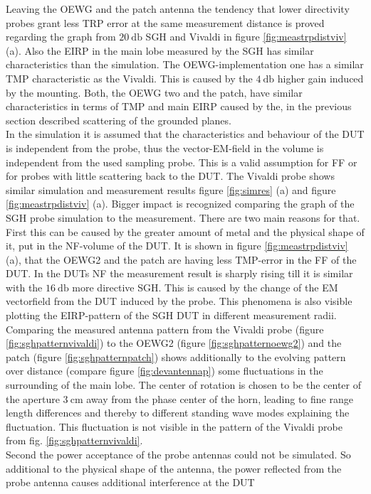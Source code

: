Leaving the \ac{OEWG} and the patch antenna the tendency that lower directivity probes grant less \ac{TRP} error at the same measurement distance is proved regarding the graph from $\SI{20}{\decibel}$ \ac{SGH} and Vivaldi in figure \ref{fig:meastrpdistviv} (a). Also the \ac{EIRP} in the main lobe measured by the \ac{SGH} has similar characteristics than the simulation. The \ac{OEWG}-implementation one has a similar \ac{TMP} characteristic as the Vivaldi. This is caused by the $\SI{4}{\decibel}$ higher gain induced by the mounting. Both, the \ac{OEWG} two and the patch, have similar characteristics in terms of \ac{TMP} and main \ac{EIRP} caused by the, in the previous section described scattering of the grounded planes.\\
In the simulation it is assumed that the characteristics and behaviour of the \ac{DUT} is independent from the probe, thus the vector-EM-field in the volume is independent from the used sampling probe. This is a valid assumption for \ac{FF} or for probes with little scattering back to the \ac{DUT}. 
The Vivaldi probe shows similar simulation and measurement results figure \ref{fig:simres} (a) and figure \ref{fig:meastrpdistviv} (a). Bigger impact is recognized comparing the graph of the \ac{SGH} probe simulation to the measurement. 
There are two main reasons for that. First this can be caused by the greater amount of metal and the physical shape of it, put in the \ac{NF}-volume of the \ac{DUT}.
It is shown in figure \ref{fig:meastrpdistviv} (a), that the \ac{OEWG}2 and the patch are having less \ac{TMP}-error in the \ac{FF} of the \ac{DUT}. In the \ac{DUT}s \ac{NF} the measurement result is sharply rising till it is similar with the $\SI{16}{\decibel}$ more directive \ac{SGH}. This is caused by the change of the \ac{EM} vectorfield from the \ac{DUT} induced by the probe. This phenomena is also visible plotting the \ac{EIRP}-pattern of the \ac{SGH} \ac{DUT} in different measurement radii. Comparing the measured antenna pattern from the Vivaldi probe (figure \ref{fig:sghpatternvivaldi}) to the \ac{OEWG}2 (figure \ref{fig:sghpatternoewg2}) and the patch (figure \ref{fig:sghpatternpatch}) shows additionally to the evolving pattern over distance (compare figure \ref{fig:devantennap}) some fluctuations in the surrounding of the main lobe. The center of rotation is chosen to be the center of the aperture $\SI{3}{\centi\meter}$ away from the phase center of the horn, leading to fine range length differences and thereby to different standing wave modes explaining the fluctuation. This fluctuation is not visible in the pattern of the Vivaldi probe from fig. \ref{fig:sghpatternvivaldi}.\\
Second the power acceptance of the probe antennas could not be simulated. So additional to the physical shape of the antenna, the power reflected from the probe antenna causes additional interference at the \ac{DUT}

